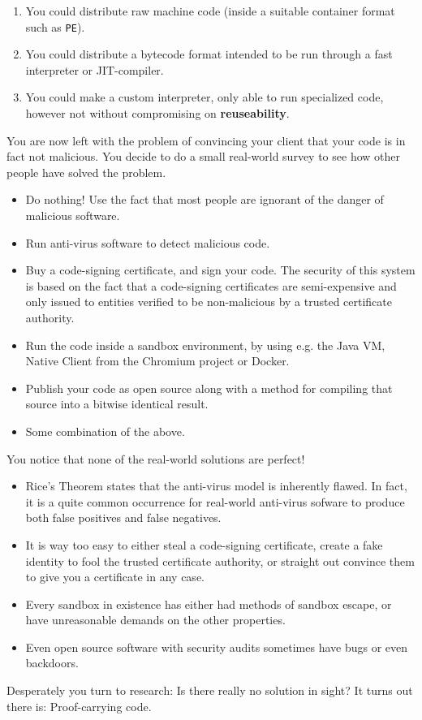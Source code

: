 \begin{enumerate}
\item You could distribute raw machine code (inside a suitable container format
  such as \texttt{PE}).
\item You could distribute a bytecode format intended to be run through a fast
  interpreter or JIT-compiler.
\item You could make a custom interpreter, only able to run specialized code,
  however not without compromising on \textbf{reuseability}.
\end{enumerate}

You are now left with the problem of convincing your client that your code is in
fact not malicious. You decide to do a small real-world survey to see how other
people have solved the problem.

\begin{itemize}
\item Do nothing! Use the fact that most people are ignorant of the danger of
  malicious software.
\item Run anti-virus software to detect malicious code.
\item Buy a code-signing certificate, and sign your code. The security of this
  system is based on the fact that a code-signing certificates are
  semi-expensive and only issued to entities verified to be non-malicious by a
  trusted certificate authority.
\item Run the code inside a sandbox environment, by using e.g. the Java VM,
  Native Client from the Chromium project or Docker.
\item Publish your code as open source along with a method for compiling that
  source into a bitwise identical result.
\item Some combination of the above.
\end{itemize}

You notice that none of the real-world solutions are perfect!

\begin{itemize}
\item Rice's Theorem states that the anti-virus model is inherently flawed. In
  fact, it is a quite common occurrence for real-world anti-virus sofware to
  produce both false positives and false negatives.
\item It is way too easy to either steal a code-signing certificate, create a
  fake identity to fool the trusted certificate authority, or straight out
  convince them to give you a certificate in any case.
\item Every sandbox in existence has either had methods of sandbox escape, or
  have unreasonable demands on the other properties.
\item Even open source software with security audits sometimes have bugs or even
  backdoors.
\end{itemize}


Desperately you turn to research: Is there really no solution in sight? It turns
out there is: Proof-carrying code.
